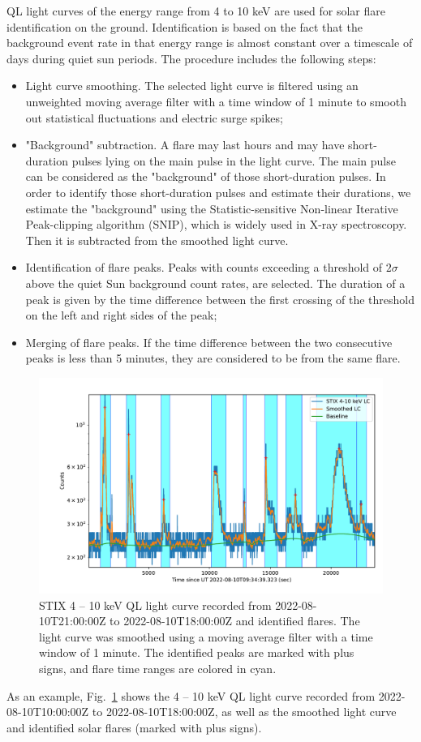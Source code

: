 \documentclass{aa}
\begin{document}
QL light curves of the energy range from  4 to 10 keV are used for solar flare identification
on the ground. Identification is based on the fact 
that the background event rate in that energy range is almost constant 
over a timescale of days during quiet sun periods. 
The procedure includes the following steps:
\begin{itemize}
  \item Light curve smoothing. The selected light curve is filtered using an unweighted
  moving average filter with a time window of 1 minute to smooth out statistical fluctuations and electric surge spikes;
  \item "Background" subtraction.  
   A flare may last hours and may have short-duration pulses lying  on the main pulse in the light curve.
   The main pulse can be considered as the "background" of those short-duration pulses.
  In order to identify those short-duration pulses  and estimate their durations, 
  we estimate  the "background"  using the Statistic-sensitive Non-linear Iterative Peak-clipping  algorithm (SNIP)\cite{sinp}, which is widely used in X-ray spectroscopy.
    Then it is subtracted from the smoothed light curve.
  \item Identification of flare peaks. Peaks with counts exceeding a threshold of $2\sigma$ 
  above the quiet Sun background count rates,  
   are selected. The duration of a peak is given by the time difference between the first 
   crossing of the threshold on the left and right sides of the peak;  
  \item Merging of flare peaks. If the time difference between the two consecutive peaks is less than 5 minutes,
   they are considered to be from the same flare.
\end{itemize}

\begin{figure}
  \centering
  \includegraphics[width=0.8\linewidth]{figures/flaredet.pdf}
  \caption{STIX 4 -- 10 keV QL light curve recorded from 2022-08-10T21:00:00Z to 2022-08-10T18:00:00Z and 
  identified flares.   
  The light curve was smoothed using a moving average filter with a time window
  of 1 minute. 
  The identified peaks are marked with plus signs, and flare time ranges are colored in cyan.
  }
  \label{fig:flare-det}
\end{figure}
As an example, Fig.~\ref{fig:flare-det} shows  the 4 -- 10 keV QL  light curve recorded from 
2022-08-10T10:00:00Z to 2022-08-10T18:00:00Z,
 as well as the smoothed light curve and  identified solar flares (marked with plus signs).
\end{document}
